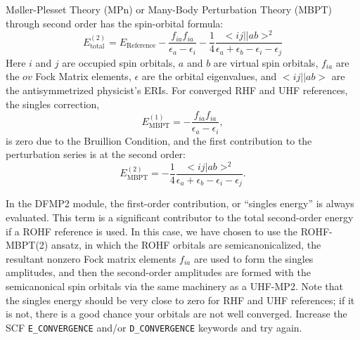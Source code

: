 M\o{}ller-Plesset Theory (MPn) or Many-Body Perturbation Theory (MBPT) through second order has the spin-orbital formula:
\begin{equation}
E_{\mathrm{total}}^{(2)}  = E_{\mathrm{Reference}} - \frac{f_{ia}
f_{ia}}{\epsilon_a - \epsilon_i} - \frac{1}{4} \frac{<ij||ab>^2}{\epsilon_a + \epsilon_b - \epsilon_i - \epsilon_j}
\end{equation}
Here $i$ and $j$ are occupied spin orbitals, $a$ and $b$ are virtual spin
orbitals, $f_{ia}$ are the $ov$ Fock Matrix elements, $\epsilon$ are the orbital
eigenvalues, and $<ij||ab>$ are the antisymmetrized physicist's ERIs. For
converged RHF and UHF references, the singles correction,
\begin{equation}
E_{\mathrm{MBPT}}^{(1)} = - \frac{f_{ia} f_{ia}}{\epsilon_a - \epsilon_i},
\end{equation}
is zero due to the Bruillion Condition, and the first contribution to the perturbation series is at the second order:
\begin{equation}
E_{\mathrm{MBPT}}^{(2)}  = - \frac{1}{4} \frac{<ij|ab>^2}{\epsilon_a + \epsilon_b - \epsilon_i - \epsilon_j}.
\end{equation}

In the DFMP2 module, the first-order contribution, or ``singles energy'' is
always evaluated. This term is a significant contributor to the total
second-order energy if a ROHF reference is used. In this case, we have chosen
to use the ROHF-MBPT(2) ansatz, in which the ROHF orbitals are
semicanonicalized, the resultant nonzero Fock matrix elements $f_{ia}$ are used
to form the singles amplitudes, and then the second-order amplitudes are formed
with the semicanonical spin orbitals via the same machinery as a UHF-MP2. Note
that the singles energy should be very close to zero for RHF and UHF references;
if it is not, there is a good chance your orbitals are not well converged.
Increase the SCF \texttt{E\_CONVERGENCE} and/or \texttt{D\_CONVERGENCE} keywords
and try again. 

